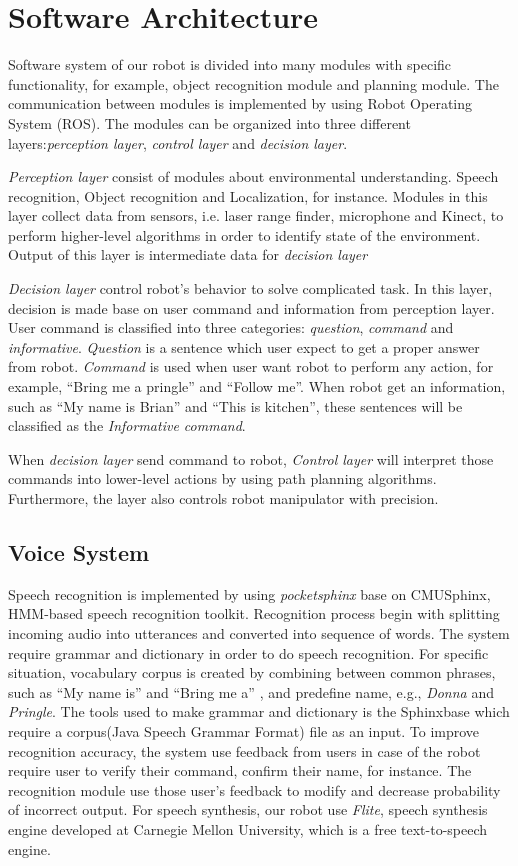 \documentclass{llncs}
\newcommand{\dq}[1]{``#1''}
\begin{document}
\section{Software Architecture}
Software system of our robot is divided into many modules with specific functionality, for example, object recognition module and planning module. The communication between modules is implemented by using Robot Operating System (ROS). The modules can be organized into three different layers:\textit{perception layer}, \textit{control layer} and \textit{decision layer}.

\textit{Perception layer} consist of modules about environmental understanding. Speech recognition, Object recognition and Localization, for instance. Modules in this layer collect data from sensors, i.e. laser range finder, microphone and Kinect, to perform higher-level algorithms in order to identify state of the environment. Output of this layer is intermediate data for \textit{decision layer}

\textit{Decision layer} control robot's behavior to solve complicated task. In this layer, decision is made base on user command and information from perception layer. User command is classified into three categories: \textit{question}, \textit{command} and \textit{informative}. \textit{Question} is a sentence which user expect to get a proper answer from robot. \textit{Command} is used when user want robot to perform any action, for example, \dq{Bring me a pringle} and \dq{Follow me}. When robot get an information, such as \dq{My name is Brian} and \dq{This is kitchen}, these sentences will be classified as the \textit{Informative command}.

When \textit{decision layer} send command to robot, \textit{Control layer} will interpret those commands into lower-level actions by using path planning algorithms. Furthermore, the layer also controls robot manipulator with precision.

\subsection{Voice System}

Speech recognition is implemented by using \textit{pocketsphinx} base on CMUSphinx, HMM-based speech recognition toolkit. Recognition process begin with splitting incoming audio into utterances and converted into sequence of words. The system require grammar and dictionary in order to do speech recognition. For specific situation, vocabulary corpus is created by combining between common phrases, such as \dq{My name is} and \dq{Bring me a} , and predefine name, e.g., \textit{Donna} and \textit{Pringle}. The tools used to make grammar and dictionary is the Sphinxbase which require a corpus(Java Speech Grammar Format) file as an input. To improve recognition accuracy, the system use feedback from users in case of the robot require user to verify their command, confirm their name, for instance. The recognition module use those user's feedback to modify and decrease probability of incorrect output. For speech synthesis, our robot use \textit{Flite}, speech synthesis engine developed at Carnegie Mellon University, which is a free text-to-speech engine. 
\end{document}

